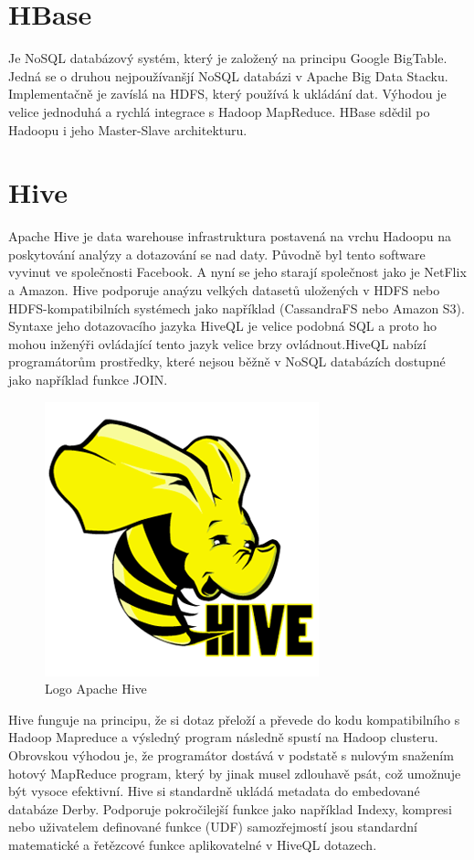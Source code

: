 \newpage 

\section{HBase}
Je NoSQL databázový systém, který je založený na principu Google BigTable. Jedná se o druhou nejpoužívanšjí NoSQL databázi v Apache Big Data Stacku. Implementačně je zavíslá na HDFS, který používá k ukládání dat. Výhodou je velice jednoduhá a rychlá integrace s Hadoop MapReduce. HBase sdědil po Hadoopu i jeho Master-Slave architekturu.


\section{Hive}


Apache Hive je data warehouse infrastruktura postavená na vrchu Hadoopu na poskytování analýzy a dotazování se nad daty. Původně byl tento software vyvinut ve společnosti Facebook. A nyní se jeho starají společnost jako je NetFlix a Amazon. Hive podporuje anaýzu velkých datasetů uložených v HDFS nebo HDFS-kompatibilních systémech jako například (CassandraFS nebo Amazon S3). Syntaxe jeho dotazovacího jazyka HiveQL je velice podobná SQL a proto ho mohou inženýři ovládající tento jazyk velice brzy ovládnout.HiveQL nabízí programátorům prostředky, které nejsou běžně v NoSQL databázích dostupné jako například funkce JOIN. 

\begin{figure}
  \centering
    \includegraphics[scale=0.5]{images/hive_logo}
\caption{Logo Apache Hive}

\end{figure}

Hive funguje na principu, že si dotaz přeloží a převede do kodu kompatibilního s Hadoop Mapreduce a výsledný program následně spustí na Hadoop clusteru. Obrovskou výhodou je, že programátor dostává v podstatě s nulovým snažením hotový MapReduce program, který by jinak musel zdlouhavě psát, což umožnuje být vysoce efektivní. Hive si standardně ukládá metadata do embedované databáze Derby. Podporuje pokročilejší funkce jako například Indexy, kompresi nebo uživatelem definované funkce (UDF) samozřejmostí jsou standardní matematické a řetězcové funkce aplikovatelné v HiveQL dotazech. 



